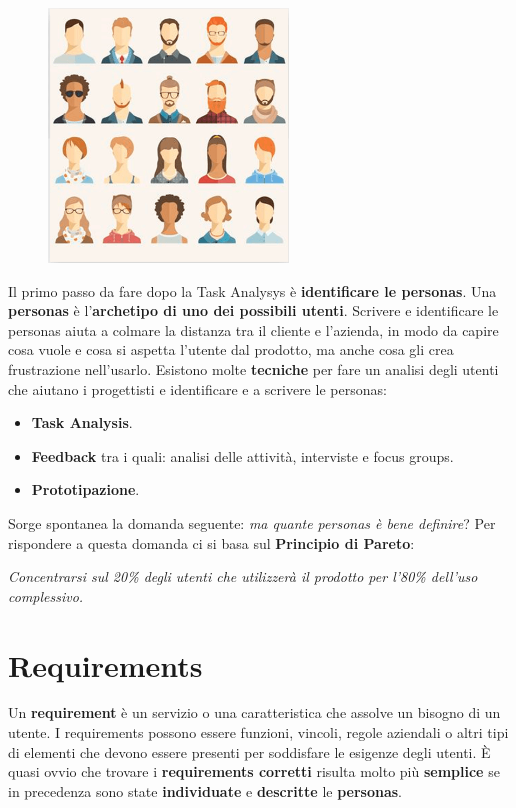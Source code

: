 \documentclass[a4paper,11pt,oneside]{book}
\begin{document}
\begin{figure}[!h]
	\centering
	\includegraphics[scale=0.55]{immagini/Personas.png}
\end{figure}

Il primo passo da fare dopo la Task Analysys è \textbf{identificare le personas}.
Una \textbf{personas} è l'\textbf{archetipo di uno dei possibili utenti}. Scrivere e
identificare le personas aiuta a colmare la distanza tra il cliente e l'azienda, in modo da capire cosa vuole e cosa si aspetta l'utente dal prodotto, ma anche cosa gli crea frustrazione nell'usarlo. Esistono molte \textbf{tecniche} per fare un analisi degli utenti che aiutano i progettisti e identificare e a scrivere le personas:

\begin{itemize}
	\item \textbf{Task Analysis}.
	\item \textbf{Feedback} tra i quali: analisi delle attività, interviste e focus groups.
	\item \textbf{Prototipazione}.
\end{itemize}

Sorge spontanea la domanda seguente: \textit{ma quante personas è bene definire}?
Per rispondere a questa domanda ci si basa sul \textbf{Principio di Pareto}: \begin{center}
	\textit{Concentrarsi sul 20\% degli utenti che utilizzerà il prodotto per l'80\% dell'uso complessivo.}
\end{center}

\pagebreak

\section{Requirements}

Un \textbf{requirement} è un servizio o una caratteristica che assolve un bisogno di un utente.
I requirements possono essere funzioni, vincoli, regole aziendali o altri tipi di elementi che devono essere presenti per soddisfare le esigenze degli utenti. È quasi ovvio che trovare i \textbf{requirements corretti} risulta molto più \textbf{semplice} se in precedenza sono state \textbf{individuate} e \textbf{descritte} le \textbf{personas}.
\end{document}
